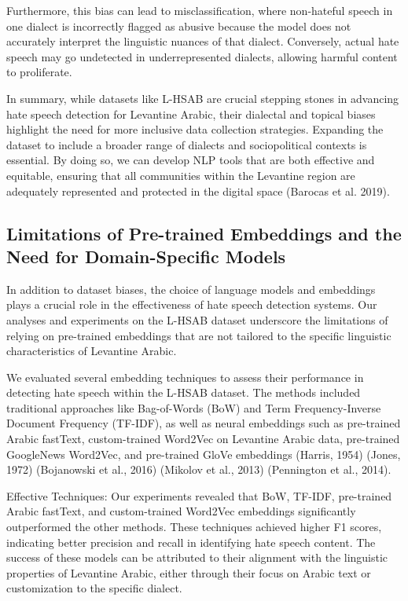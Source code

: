 \documentclass[11pt]{article}
\begin{document}
Furthermore, this bias can lead to misclassification, where non-hateful speech in one dialect is incorrectly flagged as abusive because the model does not accurately interpret the linguistic nuances of that dialect. Conversely, actual hate speech may go undetected in underrepresented dialects, allowing harmful content to proliferate.

In summary, while datasets like L-HSAB are crucial stepping stones in advancing hate speech detection for Levantine Arabic, their dialectal and topical biases highlight the need for more inclusive data collection strategies. Expanding the dataset to include a broader range of dialects and sociopolitical contexts is essential. By doing so, we can develop NLP tools that are both effective and equitable, ensuring that all communities within the Levantine region are adequately represented and protected in the digital space (Barocas et al. 2019).


\subsection{Limitations of Pre-trained Embeddings and the Need for Domain-Specific Models}

In addition to dataset biases, the choice of language models and embeddings plays a crucial role in the effectiveness of hate speech detection systems. Our analyses and experiments on the L-HSAB dataset underscore the limitations of relying on pre-trained embeddings that are not tailored to the specific linguistic characteristics of Levantine Arabic.

We evaluated several embedding techniques to assess their performance in detecting hate speech within the L-HSAB dataset. The methods included traditional approaches like Bag-of-Words (BoW) and Term Frequency-Inverse Document Frequency (TF-IDF), as well as neural embeddings such as pre-trained Arabic fastText, custom-trained Word2Vec on Levantine Arabic data, pre-trained GoogleNews Word2Vec, and pre-trained GloVe embeddings (Harris, 1954) (Jones, 1972) (Bojanowski et al., 2016) (Mikolov et al., 2013) (Pennington et al., 2014).

Effective Techniques: Our experiments revealed that BoW, TF-IDF, pre-trained Arabic fastText, and custom-trained Word2Vec embeddings significantly outperformed the other methods. These techniques achieved higher F1 scores, indicating better precision and recall in identifying hate speech content. The success of these models can be attributed to their alignment with the linguistic properties of Levantine Arabic, either through their focus on Arabic text or customization to the specific dialect.
\end{document}
